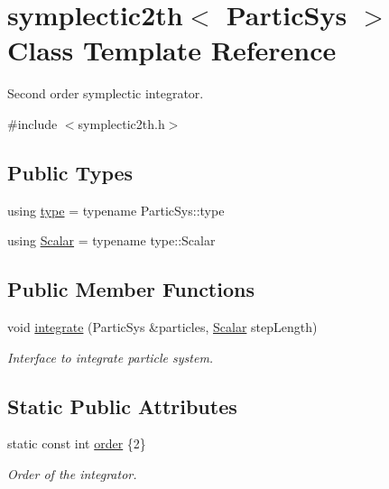 \hypertarget{classsymplectic2th}{}\section{symplectic2th$<$ Partic\+Sys $>$ Class Template Reference}
\label{classsymplectic2th}


Second order symplectic integrator.  




{\ttfamily \#include $<$symplectic2th.\+h$>$}

\subsection*{Public Types}
\begin{DoxyCompactItemize}
\item 
using \mbox{\hyperlink{classsymplectic2th_a88bc0c031313c7752d9891c927641b9f}{type}} = typename Partic\+Sys\+::type
\item 
using \mbox{\hyperlink{classsymplectic2th_a801a87947fe8e90ee68759952c937ed5}{Scalar}} = typename type\+::\+Scalar
\end{DoxyCompactItemize}
\subsection*{Public Member Functions}
\begin{DoxyCompactItemize}
\item 
void \mbox{\hyperlink{classsymplectic2th_ade78f67685ed50280a210e67397af092}{integrate}} (Partic\+Sys \&particles, \mbox{\hyperlink{classsymplectic2th_a801a87947fe8e90ee68759952c937ed5}{Scalar}} step\+Length)
\begin{DoxyCompactList}\small\item\em Interface to integrate particle system. \end{DoxyCompactList}\end{DoxyCompactItemize}
\subsection*{Static Public Attributes}
\begin{DoxyCompactItemize}
\item 
static const int \mbox{\hyperlink{classsymplectic2th_a1082d668c1081ff0116e8816f1240fcd}{order}} \{2\}
\begin{DoxyCompactList}\small\item\em Order of the integrator. \end{DoxyCompactList}\end{DoxyCompactItemize}


